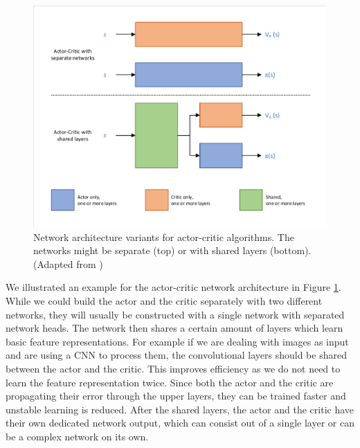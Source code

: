 \begin{figure}[ht]
  
  \begin{center}
      \includegraphics[clip, trim=10px 10px 10px 10px, width=0.95\columnwidth]{figures/rl/Actor_Critic_Architecture.pdf}
  \end{center}
  
  \caption[Actor-Critic Network Architectures]{Network architecture variants for actor-critic algorithms. The networks might be separate (top) or with shared layers (bottom). (Adapted from \cite{foundations2019graesser})}
  \label{fig:actor_critic_architecture}
\end{figure}

We illustrated an example for the actor-critic network architecture in Figure \ref{fig:actor_critic_architecture}. While we could build the actor and the critic separately with two different networks, they will usually be constructed with a single network with separated network heads. The network then shares a certain amount of layers which learn basic feature representations. For example if we are dealing with images as input and are using a CNN to process them, the convolutional layers should be shared between the actor and the critic. This improves efficiency as we do not need to learn the feature representation twice. Since both the actor and the critic are propagating their error through the upper layers, they can be trained faster and unstable learning is reduced. After the shared layers, the actor and the critic have their own dedicated network output, which can consist out of a single layer or can be a complex network on its own. 

